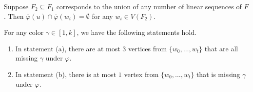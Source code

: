 \documentclass[10pt,a4paper]{amsart}
\newcommand{\pbar}{\overline{\varphi}}
\begin{document}
\begin{claim}\label{uwi} Suppose $F_2\subseteq F_1$ corresponds to the union of any number of linear sequences of $F$. Then $\pbar(u)\cap \pbar(w_i) =\emptyset$ for any $w_i\in V(F_2)$.
\end{claim}

\begin{claim}\label{gamma} For any color $\gamma \in [1,k]$,  we have the following statements hold. 
\begin{enumerate}[(1)]
    \item In statement (a),  there are at most  $3$  vertices from $\{w_0, \ldots, w_t\}$ that are all missing $\gamma$ under $\varphi$.
    \item In statement (b),  there is at  most  $1$  vertex from $\{w_0, \ldots, w_t\}$ that is  missing $\gamma$ under $\varphi$.
\end{enumerate}
\end{claim} 
\end{document}

